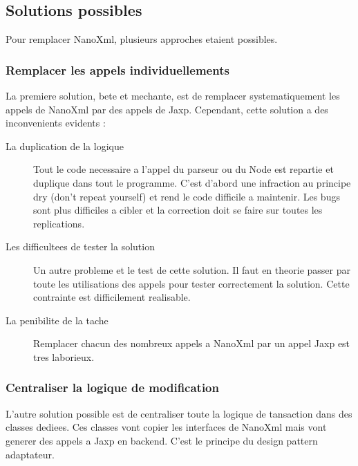\subsection{Solutions possibles}
Pour remplacer NanoXml, plusieurs approches etaient possibles. 
\subsubsection{Remplacer les appels individuellements}
La premiere solution, bete et mechante, est de remplacer systematiquement les appels de NanoXml par des appels de Jaxp. Cependant, cette solution a des inconvenients evidents :
\begin{description}
\item[La duplication de la logique] Tout le code necessaire a l'appel du parseur ou du Node est repartie et duplique dans tout le programme. C'est d'abord une infraction au principe dry (don't repeat yourself) et rend le code difficile a maintenir. Les bugs sont plus difficiles a cibler et la correction doit se faire sur toutes les replications.
\item[Les difficultees de tester la solution] Un autre probleme et le test de cette solution. Il faut en theorie passer par toute les utilisations des appels pour tester correctement la solution. Cette contrainte est difficilement realisable.
\item[La penibilite de la tache] Remplacer chacun des nombreux appels a NanoXml par un appel Jaxp est tres laborieux. 
\end{description}
\subsubsection{Centraliser la logique de modification}
L'autre solution possible est de centraliser toute la logique de tansaction dans des classes dediees. Ces classes vont copier les interfaces de NanoXml mais vont generer des appels a Jaxp en backend. C'est le principe du design pattern adaptateur.

